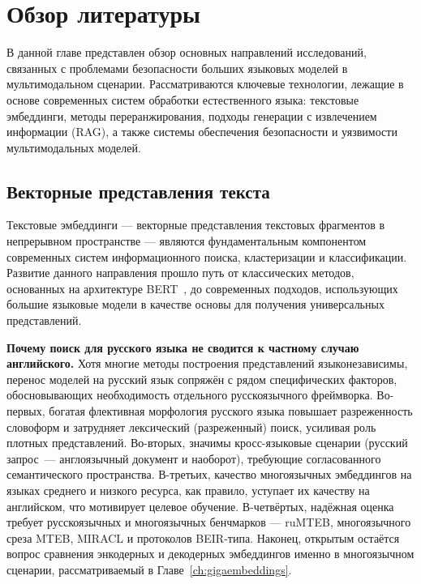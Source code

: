 \chapter{Обзор литературы}\label{ch:lit_review}

В данной главе представлен обзор основных направлений исследований, связанных с проблемами безопасности больших языковых моделей в мультимодальном сценарии. Рассматриваются ключевые технологии, лежащие в основе современных систем обработки естественного языка: текстовые эмбеддинги, методы переранжирования, подходы генерации с извлечением информации (RAG), а также системы обеспечения безопасности и уязвимости мультимодальных моделей.

\section{Векторные представления текста}\label{sec:embeddings}

Текстовые эмбеддинги --- векторные представления текстовых фрагментов в непрерывном пространстве --- являются фундаментальным компонентом современных систем информационного поиска, кластеризации и классификации. Развитие данного направления прошло путь от классических методов, основанных на архитектуре BERT~\cite{devlin2019bert}, до современных подходов, использующих большие языковые модели в качестве основы для получения универсальных представлений.

\textbf{Почему поиск для русского языка не сводится к частному случаю английского.} Хотя многие методы построения представлений язык\-онезависимы, перенос моделей на русский язык сопряжён с рядом специфических факторов, обосновывающих необходимость отдельного русскоязычного фреймворка. Во-первых, богатая флективная морфология русского языка повышает разреженность словоформ и затрудняет лексический (разреженный) поиск, усиливая роль плотных представлений. Во-вторых, значимы кросс-языковые сценарии (русский запрос~--- англоязычный документ и наоборот), требующие согласованного семантического пространства. В-третьих, качество многоязычных эмбеддингов на языках среднего и низкого ресурса, как правило, уступает их качеству на английском, что мотивирует целевое обучение. В-четвёртых, надёжная оценка требует русскоязычных и многоязычных бенчмарков --- ruMTEB, многоязычного среза MTEB, MIRACL и протоколов BEIR-типа. Наконец, открытым остаётся вопрос сравнения энкодерных и декодерных эмбеддингов именно в многоязычном сценарии, рассматриваемый в Главе~\ref{ch:gigaembeddings}.

